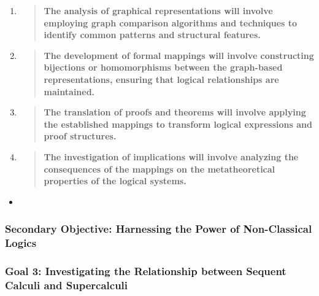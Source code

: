 \begin{itemize}
  \begin{enumerate}
  \def\labelenumi{\arabic{enumi}.}
  \item
    \begin{quote}
    \textbf{The analysis of graphical representations will involve
    employing graph comparison algorithms and techniques to identify
    common patterns and structural features.\\
    }
    \end{quote}
  \item
    \begin{quote}
    \textbf{The development of formal mappings will involve constructing
    bijections or homomorphisms between the graph-based representations,
    ensuring that logical relationships are maintained.\\
    }
    \end{quote}
  \item
    \begin{quote}
    \textbf{The translation of proofs and theorems will involve applying
    the established mappings to transform logical expressions and proof
    structures.\\
    }
    \end{quote}
  \item
    \begin{quote}
    \textbf{The investigation of implications will involve analyzing the
    consequences of the mappings on the metatheoretical properties of
    the logical systems.\\
    }
    \end{quote}
  \end{enumerate}
\end{itemize}

\begin{itemize}
\item
  \begin{quote}
  \textbf{\hfill\break
  }
  \end{quote}
\end{itemize}

\hypertarget{secondary-objective-harnessing-the-power-of-non-classical-logics}{%
\subsubsection{Secondary Objective: Harnessing the Power of
Non-Classical
Logics}\label{secondary-objective-harnessing-the-power-of-non-classical-logics}}

\hypertarget{goal-3-investigating-the-relationship-between-sequent-calculi-and-supercalculi}{%
\subsubsection{Goal 3: Investigating the Relationship between Sequent
Calculi and
Supercalculi}\label{goal-3-investigating-the-relationship-between-sequent-calculi-and-supercalculi}}

